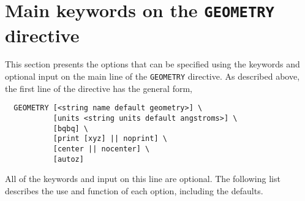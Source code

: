 \section{Main keywords on the {\tt GEOMETRY} directive}
\label{sec:geomkeys}

This section presents the options that can be specified using the keywords 
and optional input on the main line of the {\tt GEOMETRY} directive.
As described above, the first line of the directive has the general form,
\begin{verbatim}
  GEOMETRY [<string name default geometry>] \
           [units <string units default angstroms>] \
           [bqbq] \
           [print [xyz] || noprint] \
           [center || nocenter] \
           [autoz]
\end{verbatim}
    
All of the keywords and input on this line are optional.  The following
list describes the use and function of each option, including the defaults.

